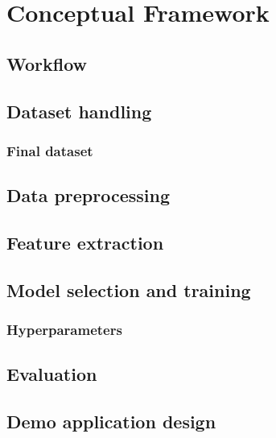 \chapter{Conceptual Framework}

\section{Workflow}

\section{Dataset handling}
\subsection{Final dataset}

\section{Data preprocessing}

\section{Feature extraction}

\section{Model selection and training}
\subsection{Hyperparameters}

\section{Evaluation}

\section{Demo application design}
